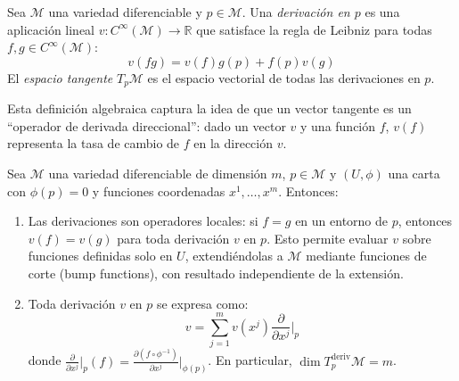 \begin{definition}\label{def:espacio_tangente_derivaciones}
Sea $\mathcal{M}$ una variedad diferenciable y $p \in \mathcal{M}$. Una \textit{derivación en $p$} es una aplicación lineal $v: C^\infty(\mathcal{M}) \to \mathbb{R}$ que satisface la regla de Leibniz para todas $f, g \in C^\infty(\mathcal{M})$:
\[
v(fg) = v(f)g(p) + f(p)v(g)
\]
El \textit{espacio tangente} $T_p\mathcal{M}$ es el espacio vectorial de todas las derivaciones en $p$.
\end{definition}

Esta definición algebraica captura la idea de que un vector tangente es un ``operador de derivada direccional'': dado un vector $v$ y una función $f$, $v(f)$ representa la tasa de cambio de $f$ en la dirección $v$.

\begin{lemma}\label{lem:descomposicion_derivaciones}
Sea $\mathcal{M}$ una variedad diferenciable de dimensión $m$, $p \in \mathcal{M}$ y $(U, \phi)$ una carta con $\phi(p) = 0$ y funciones coordenadas $x^1, \ldots, x^m$. Entonces:
\begin{enumerate}
	\item Las derivaciones son operadores locales: si $f = g$ en un entorno de $p$, entonces $v(f) = v(g)$ para toda derivación $v$ en $p$. Esto permite evaluar $v$ sobre funciones definidas solo en $U$, extendiéndolas a $\mathcal{M}$ mediante funciones de corte (bump functions), con resultado independiente de la extensión.
	\item Toda derivación $v$ en $p$ se expresa como:
	\[
	v = \sum_{j=1}^{m} v(x^j) \frac{\partial}{\partial x^j}\bigg|_p
	\]
	donde $\frac{\partial}{\partial x^j}\big|_p(f) = \frac{\partial(f \circ \phi^{-1})}{\partial x^j}\big|_{\phi(p)}$. En particular, $\dim T_p^{\text{deriv}}\mathcal{M} = m$.
\end{enumerate}
\end{lemma}

